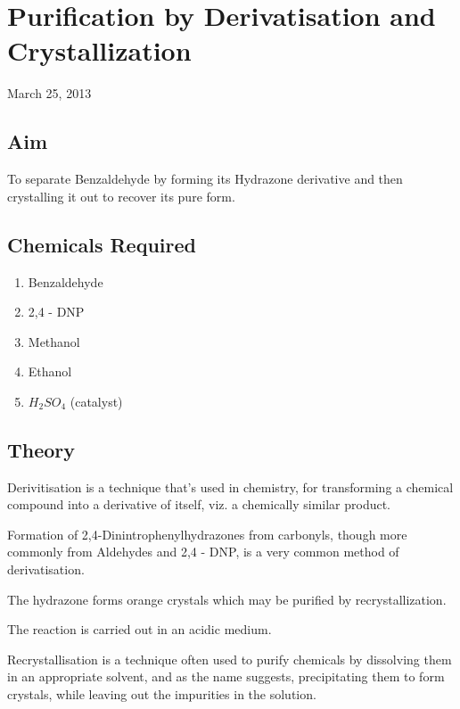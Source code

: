 \chapter{Purification by Derivatisation and Crystallization}
\begin{flushright}
March 25, 2013
\end{flushright}
\section{Aim}
To separate Benzaldehyde by forming its Hydrazone derivative and then crystalling it out to recover its pure form.

\section {Chemicals Required}


	\begin{enumerate}
		\item Benzaldehyde
		\item 2,4 - DNP
		\item Methanol
		\item Ethanol
		\item $H_2SO_4$ (catalyst)
	\end{enumerate}

\section{Theory}
	Derivitisation is a technique that's used in chemistry, for transforming a chemical compound into a derivative of itself, viz. a chemically similar product.
	\par
	Formation of 2,4-Dinintrophenylhydrazones from carbonyls, though more commonly from Aldehydes and 2,4 - DNP, is a very common method of derivatisation.
	\par
	The hydrazone forms orange crystals which may be purified by recrystallization.
	\par
	The reaction is carried out in an acidic medium.
	\par
	Recrystallisation is a technique often used to purify chemicals by dissolving them in an appropriate solvent, and as the name suggests, precipitating them to form crystals, while leaving out the impurities in the solution.

